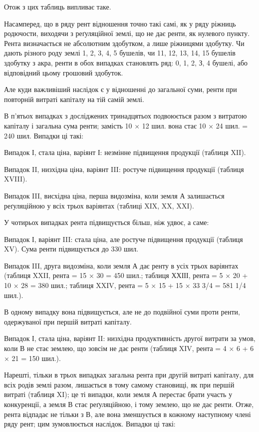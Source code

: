 Отож з цих таблиць випливає таке.

Насамперед, що в ряду рент відношення точно такі самі, як у ряду ріжниць
родючости, виходячи з реґуляційної землі, що не дає ренти, як нулевого
пункту. Рента визначається не абсолютним здобутком, а лише ріжницями здобутку.
Чи дають різного роду землі 1, 2, 3, 4, 5 бушелів, чи 11, 12, 13, 14,
15 бушелів здобутку з акра, ренти в обох випадках становлять ряд: 0, 1, 2,
З, 4 бушелі, або відповідний цьому грошовий здобуток.

Але куди важливіший наслідок є у відношенні до загальної суми, ренти
при повторній витраті капіталу на тій самій землі.

В п’ятьох випадках з досліджених тринадцятьох подвоюється разом з витратою
капіталу і загальна сума ренти; замість 10 × 12 шил. вона стає
10 × 24 шил. = 240 шил. Випадки ці такі:

Випадок І, стала ціна, варіянт І: незмінне підвищення продукції (таблиця
XII).

Випадок II, низхідна ціна, варіянт III: ростуче підвищення продукції
(таблиця XVIII).

Випадок III, висхідна ціна, перша видозміна, коли земля А залишається
реґуляційною у всіх трьох варіянтах (таблиці XIX, XX, XXI).

У чотирьох випадках рента підвищується більш, ніж удвоє, а саме:

Випадок І, варіянт III: стала ціна, але ростуче підвищення продукції
(таблиця XV). Сума ренти підвищується до 330 шил.

Випадок III, друга видозміна, коли земля А дає ренту в усіх трьох варіянтах
(таблиця XXII, рента = 15 × 30 = 450 шил.; таблиця ХХІІІ, рента = 5 ×
20 + 10 × 28 = 380 шил.; таблиця XXIV, рента = 5 × 15 + 15 × 33 3/4 =
581 1/4 шил.).

В одному випадку вона підвищується, але не до подвійної суми проти
ренти, одержуваної при першій витраті капіталу.

Випадок І, стала ціна, варіянт II: низхідна продуктивність другої витрати
за умов, коли В не стає землею, що зовсім не дає ренти (таблиця XIV, рента
= 4 × 6 + 6 × 21 = 150 шил.).

Нарешті, тільки в трьох випадках загальна рента при другій витраті
капіталу, для всіх родів землі разом, лишається в тому самому становищі, як при
першій витраті (таблиця XI); це ті випадки, коли земля А перестає брати участь
у конкуренції, а земля В стає реґуляційною, і тому землею, що не дає ренти.
Отже, рента відпадає не тільки з В, але вона зменшується в кожному наступному
члені ряду рент; цим зумовлюється наслідок. Випадки ці такі:

